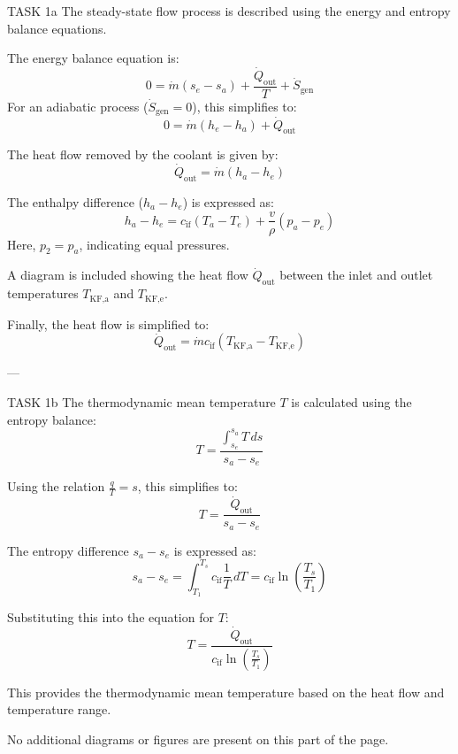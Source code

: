 TASK 1a  
The steady-state flow process is described using the energy and entropy balance equations.  

The energy balance equation is:  
\[
0 = \dot{m}(s_e - s_a) + \frac{\dot{Q}_{\text{out}}}{T} + \dot{S}_{\text{gen}}
\]  
For an adiabatic process (\( \dot{S}_{\text{gen}} = 0 \)), this simplifies to:  
\[
0 = \dot{m}(h_e - h_a) + \dot{Q}_{\text{out}}
\]  

The heat flow removed by the coolant is given by:  
\[
\dot{Q}_{\text{out}} = \dot{m}(h_a - h_e)
\]  

The enthalpy difference (\( h_a - h_e \)) is expressed as:  
\[
h_a - h_e = c_{\text{if}}(T_a - T_e) + \frac{v}{\rho}(p_a - p_e)
\]  
Here, \( p_2 = p_a \), indicating equal pressures.  

A diagram is included showing the heat flow \( \dot{Q}_{\text{out}} \) between the inlet and outlet temperatures \( T_{\text{KF,a}} \) and \( T_{\text{KF,e}} \).  

Finally, the heat flow is simplified to:  
\[
\dot{Q}_{\text{out}} = \dot{m} c_{\text{if}} (T_{\text{KF,a}} - T_{\text{KF,e}})
\]  

---

TASK 1b  
The thermodynamic mean temperature \( T \) is calculated using the entropy balance:  
\[
T = \frac{\int_{s_e}^{s_a} T \, ds}{s_a - s_e}
\]  

Using the relation \( \frac{q}{T} = s \), this simplifies to:  
\[
T = \frac{\dot{Q}_{\text{out}}}{s_a - s_e}
\]  

The entropy difference \( s_a - s_e \) is expressed as:  
\[
s_a - s_e = \int_{T_1}^{T_s} c_{\text{if}} \frac{1}{T} \, dT = c_{\text{if}} \ln \left( \frac{T_s}{T_1} \right)
\]  

Substituting this into the equation for \( T \):  
\[
T = \frac{\dot{Q}_{\text{out}}}{c_{\text{if}} \ln \left( \frac{T_s}{T_1} \right)}
\]  

This provides the thermodynamic mean temperature based on the heat flow and temperature range.  

No additional diagrams or figures are present on this part of the page.